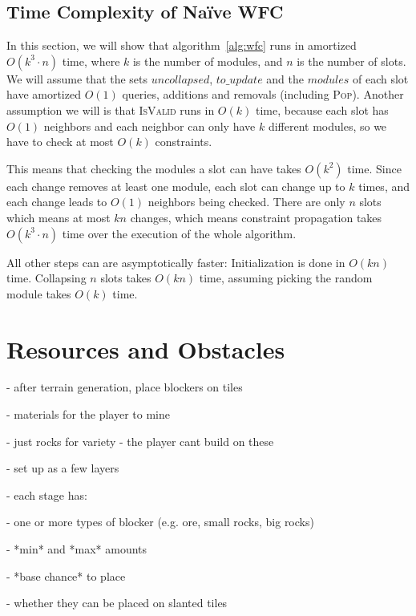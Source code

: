 
\subsection{Time Complexity of Na\"{i}ve WFC}

In this section, we will show that algorithm~\ref{alg:wfc} runs in amortized $O(k^3 \cdot n)$ time, where $k$ is the number of modules, and $n$ is the number of slots.
We will assume that the sets $uncollapsed$, $to\_update$ and the $modules$ of each slot have amortized $O(1)$ queries, additions and removals (including \textsc{Pop}).
Another assumption we will is that \textsc{IsValid} runs in $O(k)$ time, because each slot has $O(1)$ neighbors and each neighbor can only have $k$ different modules, so we have to check at most $O(k)$ constraints.

This means that checking the modules a slot can have takes $O(k^2)$ time.
Since each change removes at least one module, each slot can change up to $k$ times, and each change leads to $O(1)$ neighbors being checked.
There are only $n$ slots which means at most $kn$ changes, which means constraint propagation takes $O(k^3 \cdot n)$ time over the execution of the whole algorithm.

All other steps can are asymptotically faster:
Initialization is done in $O(kn)$ time.
Collapsing $n$ slots takes $O(kn)$ time, assuming picking the random module takes $O(k)$ time.

\section{Resources and Obstacles}

- after terrain generation, place blockers on tiles

- materials for the player to mine

- just rocks for variety - the player cant build on these

- set up as a few layers

- each stage has:

- one or more types of blocker (e.g. ore, small rocks, big rocks)

- *min* and *max* amounts

- *base chance* to place

- whether they can be placed on slanted tiles

